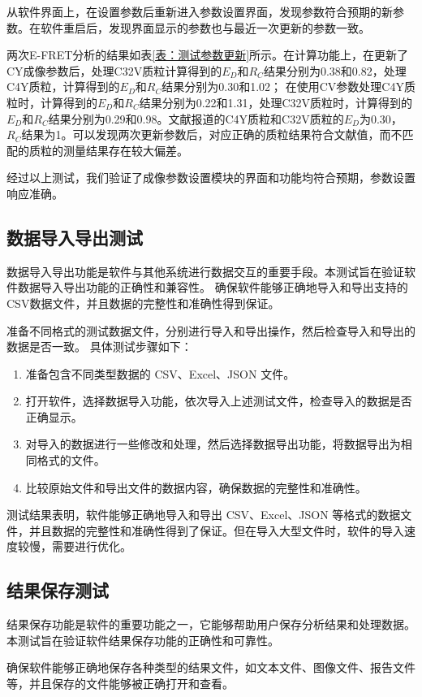 从软件界面上，在设置参数后重新进入参数设置界面，发现参数符合预期的新参数。在软件重启后，发现界面显示的参数也与最近一次更新的参数一致。

两次E-FRET分析的结果如表\ref{表：测试参数更新}所示。在计算功能上，在更新了CY成像参数后，处理C32V质粒计算得到的$E_D$和$R_C$结果分别为0.38和0.82，处理C4Y质粒，计算得到的$E_D$和$R_C$结果分别为0.30和1.02；
在使用CV参数处理C4Y质粒时，计算得到的$E_D$和$R_C$结果分别为0.22和1.31，处理C32V质粒时，计算得到的$E_D$和$R_C$结果分别为0.29和0.98。文献报道的C4Y质粒和C32V质粒的$E_D$为0.30，$R_C$结果为1。可以发现两次更新参数后，对应正确的质粒结果符合文献值，而不匹配的质粒的测量结果存在较大偏差。

经过以上测试，我们验证了成像参数设置模块的界面和功能均符合预期，参数设置响应准确。

\subsection{数据导入导出测试}
数据导入导出功能是软件与其他系统进行数据交互的重要手段。本测试旨在验证软件数据导入导出功能的正确性和兼容性。
确保软件能够正确地导入和导出支持的CSV数据文件，并且数据的完整性和准确性得到保证。

准备不同格式的测试数据文件，分别进行导入和导出操作，然后检查导入和导出的数据是否一致。
具体测试步骤如下：
\begin{enumerate}
    \item 准备包含不同类型数据的 CSV、Excel、JSON 文件。
    \item 打开软件，选择数据导入功能，依次导入上述测试文件，检查导入的数据是否正确显示。
    \item 对导入的数据进行一些修改和处理，然后选择数据导出功能，将数据导出为相同格式的文件。
    \item 比较原始文件和导出文件的数据内容，确保数据的完整性和准确性。
\end{enumerate}

测试结果表明，软件能够正确地导入和导出 CSV、Excel、JSON 等格式的数据文件，并且数据的完整性和准确性得到了保证。但在导入大型文件时，软件的导入速度较慢，需要进行优化。

\subsection{结果保存测试}
结果保存功能是软件的重要功能之一，它能够帮助用户保存分析结果和处理数据。本测试旨在验证软件结果保存功能的正确性和可靠性。

确保软件能够正确地保存各种类型的结果文件，如文本文件、图像文件、报告文件等，并且保存的文件能够被正确打开和查看。

